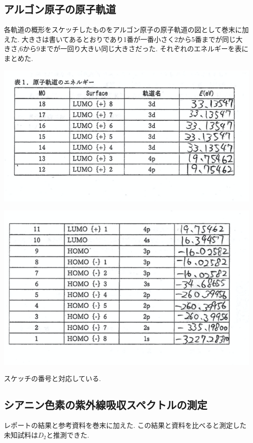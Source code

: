 \documentclass[a4j,10pt,dvipdfmx]{jarticle}
\begin{document}
  \subsection{アルゴン原子の原子軌道}
  各軌道の概形をスケッチしたものをアルゴン原子の原子軌道の図として巻末に加えた.
  大きさは書いてあるとおりであり1番が一番小さく2から5番までが同じ大きさ,6から9までが一回り大きい同じ大きさだった.
  それぞれのエネルギーを表にまとめた.
  \begin{center}
    \includegraphics[width=15cm]{energy1.png}
  \end{center}
  \begin{center}
    \includegraphics[width=15cm]{energy2.png}
  \end{center}
  スケッチの番号と対応している.
  \subsection{シアニン色素の紫外線吸収スペクトルの測定}

  レポートの結果と参考資料を巻末に加えた.
  この結果と資料を比べると測定した未知試料は$D_2$と推測できた.
\end{document}
